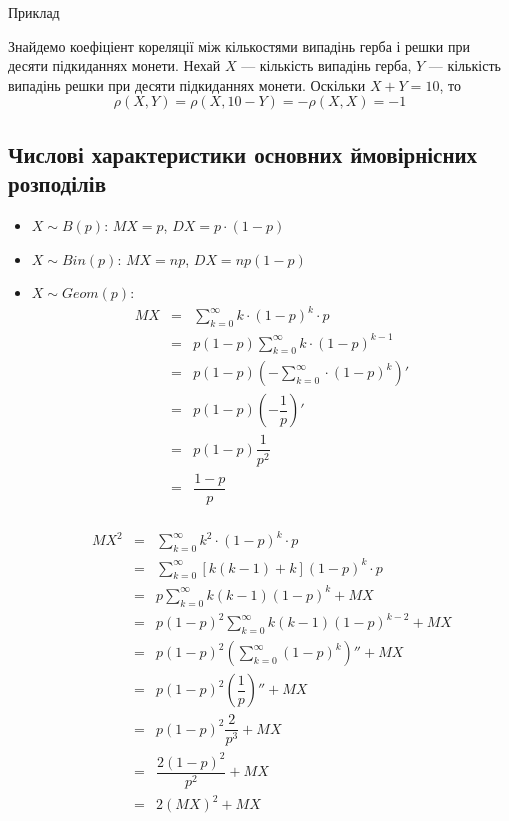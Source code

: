 Приклад
\begin{example}
\end{example}
Знайдемо коефіціент кореляції між кількостями випадінь герба і
решки  при десяти підкиданнях монети. 
 Нехай $X$ --- кількість випадінь герба, $Y$ --- кількість випадінь
 решки при десяти підкиданнях монети.
 Оскільки $X + Y = 10$, то
 $$\rho(X, Y) = \rho(X, 10 - Y) = -\rho(X, X) = -1$$

\subsection{Числові характеристики основних ймовірнісних розподілів}

\begin{itemize}
    \item $X \sim B(p)$: $MX = p$, $DX = p \cdot (1-p)$
    \item $X \sim Bin(p)$: $MX = np$, $DX = np(1-p)$
    \item $X \sim Geom(p)$:
        $$\begin{array}{rcl}
            MX & = & \sum\limits_{k=0}^{\infty} k \cdot (1- p)^k \cdot p \\
            & = & p(1-p) \sum\limits_{k=0}^{\infty} k \cdot (1- p)^{k-1} \\
            & = & p(1-p) (-\sum\limits_{k=0}^{\infty}\cdot (1- p)^{k})' \\
            & = & p(1-p) (-\dfrac{1}{p})' \\
            & = & p(1-p) \dfrac{1}{p^2} \\
            & = & \dfrac{1-p}{p} \\
        \end{array}$$

        $$\begin{array}{rcl}
            MX^2 & = & \sum\limits_{k=0}^{\infty} k^2 \cdot (1- p)^k \cdot p \\
            & = & \sum\limits_{k=0}^{\infty} [k (k-1) + k]  (1- p)^{k} \cdot p \\
            & = & p \sum\limits_{k=0}^{\infty} k (k-1) (1- p)^{k} + MX \\
            & = & p (1-p)^2 \sum\limits_{k=0}^{\infty} k (k-1) (1- p)^{k-2} + MX \\
            & = & p (1-p)^2 (\sum\limits_{k=0}^{\infty} (1- p)^{k})'' + MX \\
            & = & p (1-p)^2 (\dfrac{1}{p})'' + MX \\
            & = & p (1-p)^2 \dfrac{2}{p^3} + MX \\
            & = & \dfrac{2(1-p)^2}{p^2} + MX \\
            & = & 2 (MX)^2 + MX \\
        \end{array}$$


\end{itemize}
